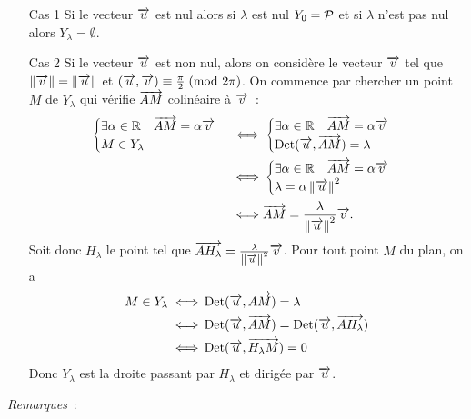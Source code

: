 \begin{enumerate}
    \item[Cas 1] Si le vecteur \(\vu\) est nul alors si \(\lambda\) est nul 
        \(Y_0 = \P\) et si \(\lambda\) n'est pas nul alors \(Y_\lambda = 
        \emptyset\).
    \item[Cas 2] Si le vecteur \(\vu\) est non nul, alors on considère le 
        vecteur \(\vv\) tel que \(\norme{\vv} = \norme{\vu}\) et 
        \(\congru{(\vu , \vv)}{\frac{\pi}{2}}{2\pi}\). On commence par chercher un 
        point \(M\) de \(Y_\lambda\) qui vérifie \(\vect{AM}\) colinéaire à 
        \(\vv\)~:
        \begin{align}
            \begin{cases} 
                \exists \alpha \in \R \quad \vect{AM} = \alpha \vv \\  
                M \in Y_\lambda
            \end{cases} 
            \iff & 
            \begin{cases}
                \exists \alpha \in \R \quad \vect{AM} = \alpha \vv \\ 
                \Det(\vu , \vect{AM}) = \lambda
            \end{cases} \\
            \iff & 
            \begin{cases}
                \exists \alpha \in \R \quad \vect{AM} = \alpha \vv \\ \lambda = 
                \alpha \norme{\vu}^2
            \end{cases} \\
            \iff & \vect{AM} = \frac{\lambda}{\norme{\vu}^2} \vv.
        \end{align}
        Soit donc \(H_\lambda\) le point tel que \(\vect{AH_\lambda} = 
        \frac{\lambda}{\norme{\vu}^2} \vv\). Pour tout point \(M\) du plan, on a
        \begin{align}
            M \in Y_\lambda \iff & \Det(\vu , \vect{AM}) = \lambda \\ \iff & 
            \Det(\vu , \vect{AM}) = \Det(\vu , \vect{AH_\lambda}) \\ \iff & 
            \Det(\vu , \vect{H_\lambda M}) = 0
        \end{align}
        Donc \(Y_\lambda\) est la droite passant par \(H_\lambda\) et dirigée 
        par \(\vu\).
\end{enumerate}

\emph{Remarques}~:

